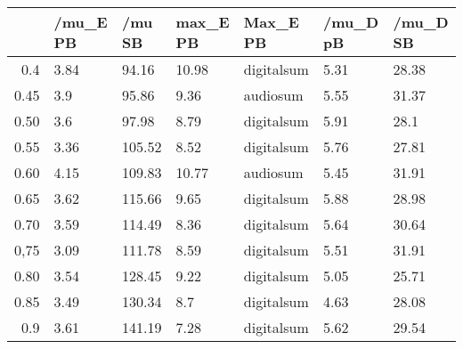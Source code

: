 \begin{table}[ht]
\centering
\begin{tabular}{rllllll}
  \hline
 & /mu\_E PB & /mu SB & max\_E PB & Max\_E PB & /mu\_D pB & /mu\_D SB \\ 
  \hline
0.4 & 3.84 & 94.16 & 10.98 & digitalsum & 5.31 & 28.38 \\ 
  0.45 & 3.9 & 95.86 & 9.36 & audiosum & 5.55 & 31.37 \\ 
  0.50 & 3.6 & 97.98 & 8.79 & digitalsum & 5.91 & 28.1 \\ 
  0.55 & 3.36 & 105.52 & 8.52 & digitalsum & 5.76 & 27.81 \\ 
  0.60 & 4.15 & 109.83 & 10.77 & audiosum & 5.45 & 31.91 \\ 
  0.65 & 3.62 & 115.66 & 9.65 & digitalsum & 5.88 & 28.98 \\ 
  0.70 & 3.59 & 114.49 & 8.36 & digitalsum & 5.64 & 30.64 \\ 
  0,75 & 3.09 & 111.78 & 8.59 & digitalsum & 5.51 & 31.91 \\ 
  0.80 & 3.54 & 128.45 & 9.22 & digitalsum & 5.05 & 25.71 \\ 
  0.85 & 3.49 & 130.34 & 8.7 & digitalsum & 4.63 & 28.08 \\ 
  0.9 & 3.61 & 141.19 & 7.28 & digitalsum & 5.62 & 29.54 \\ 
   \hline
\end{tabular}
\end{table}
